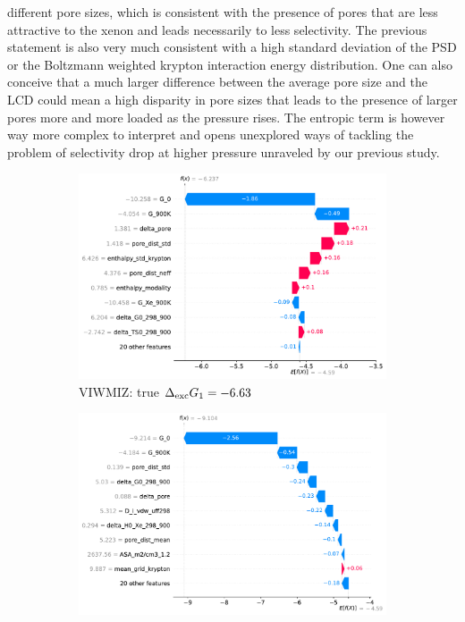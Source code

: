 \documentclass[main]{subfiles}
\begin{document}
different pore sizes, which is consistent with the presence of pores that are less attractive to the xenon and leads necessarily to less selectivity. The previous statement is also very much consistent with a high standard deviation of the PSD or the Boltzmann weighted krypton interaction energy distribution. One can also conceive that a much larger difference between the average pore size and the LCD could mean a high disparity in pore sizes that leads to the presence of larger pores more and more loaded as the pressure rises.
The entropic term is however way more complex to interpret and opens unexplored ways of tackling the problem of selectivity drop at higher pressure unraveled by our previous study\cite{Ren_2021}.

\begin{figure}[ht]
    \centering
    \begin{subfigure}[b]{0.47\textwidth}
      \centering
      \includegraphics[width=\textwidth]{figures/4-ml/main/VIWMIZ_clean.pdf}
      \caption{VIWMIZ: true $\Delta_{\text{exc}} G_1=-6.63$}
    \end{subfigure}
         \hfill
    \begin{subfigure}[b]{0.47\textwidth}
      \centering
      \includegraphics[width=\textwidth]{figures/4-ml/main/BIMDIL_clean.pdf}

\end{subfigure}
\end{figure}
\end{document}
